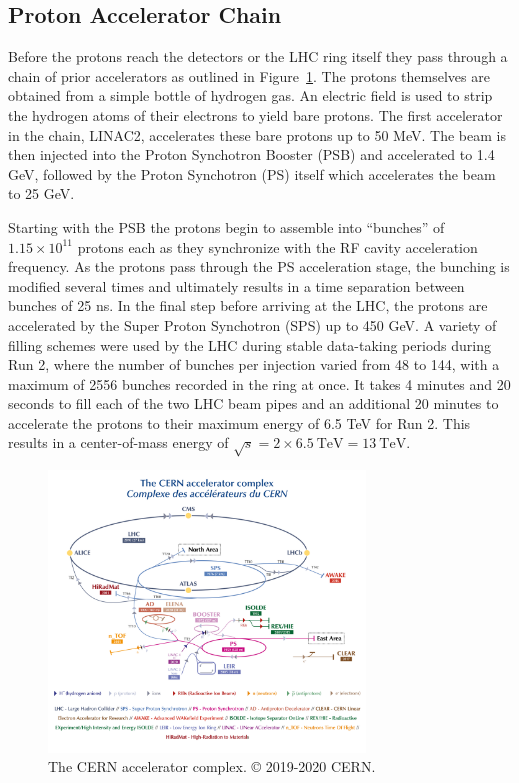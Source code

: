 
\subsection{Proton Accelerator Chain}
Before the protons reach the detectors or the LHC ring itself they pass through a chain of prior accelerators as outlined in Figure~\ref{fig:cern_accelerator_complex}.
The protons themselves are obtained from a simple bottle of hydrogen gas.
An electric field is used to strip the hydrogen atoms of their electrons to yield bare protons.
The first accelerator in the chain, LINAC2, accelerates these bare protons up to 50 MeV.
The beam is then injected into the Proton Synchotron Booster (PSB) and accelerated to 1.4 GeV, followed by the Proton Synchotron (PS) itself which accelerates the beam to 25 GeV.

Starting with the PSB the protons begin to assemble into ``bunches'' of $1.15 \times 10^{11}$ protons each as they synchronize with the RF cavity acceleration frequency. 
As the protons pass through the PS acceleration stage, the bunching is modified several times and ultimately results in a time separation between bunches of 25 ns.
In the final step before arriving at the LHC, the protons are accelerated by the Super Proton Synchotron (SPS) up to 450 GeV.
A variety of filling schemes were used by the LHC during stable data-taking periods during Run 2, where the number of bunches per injection varied from 48 to 144, with a maximum of 2556 bunches recorded in the ring at once.
It takes 4 minutes and 20 seconds to fill each of the two LHC beam pipes and an additional 20 minutes to accelerate the protons to their maximum energy of 6.5 TeV for Run 2.
This results in a center-of-mass energy of $\sqrt{s} = 2 \times 6.5\ \mathrm{TeV} = 13\ \mathrm{TeV}$.

\begin{figure}
	\centering
	\includegraphics[width=0.75\textwidth]{cern_complex}
	\caption{The CERN accelerator complex. © 2019-2020 CERN.}
	\label{fig:cern_accelerator_complex}
\end{figure}

